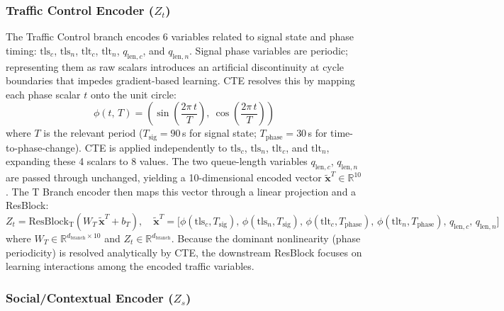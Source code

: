 \documentclass[journal]{IEEEtran}
\begin{document}
\subsubsection{Traffic Control Encoder ($Z_t$)}

The Traffic Control branch encodes 6 variables related to signal state and phase timing: $\text{tls}_c$, $\text{tls}_n$, $\text{tlt}_c$, $\text{tlt}_n$, $q_{\text{len},c}$, and $q_{\text{len},n}$.
Signal phase variables are periodic; representing them as raw scalars introduces an artificial discontinuity at cycle boundaries that impedes gradient-based learning.
CTE resolves this by mapping each phase scalar $t$ onto the unit circle:
\begin{equation}
\phi(t,\, T) = \left(\sin\!\left(\frac{2\pi\, t}{T}\right),\ \cos\!\left(\frac{2\pi\, t}{T}\right)\right)
\label{eq:cte}
\end{equation}
where $T$ is the relevant period ($T_\text{sig} = 90$\,s for signal state; $T_\text{phase} = 30$\,s for time-to-phase-change).
CTE is applied independently to $\text{tls}_c$, $\text{tls}_n$, $\text{tlt}_c$, and $\text{tlt}_n$, expanding these 4 scalars to 8 values.
The two queue-length variables $q_{\text{len},c}$, $q_{\text{len},n}$ are passed through unchanged, yielding a 10-dimensional encoded vector $\tilde{\mathbf{x}}^T \in \mathbb{R}^{10}$.
The T Branch encoder then maps this vector through a linear projection and a ResBlock:
\begin{equation}
Z_t = \text{ResBlock}_\text{T}\!\left(W_T\, \tilde{\mathbf{x}}^T + b_T\right), \quad
\tilde{\mathbf{x}}^T = \bigl[\phi(\text{tls}_c,T_\text{sig}),\, \phi(\text{tls}_n,T_\text{sig}),\, \phi(\text{tlt}_c,T_\text{phase}),\, \phi(\text{tlt}_n,T_\text{phase}),\, q_{\text{len},c},\, q_{\text{len},n}\bigr]
\label{eq:zt}
\end{equation}
where $W_T \in \mathbb{R}^{d_\text{branch} \times 10}$ and $Z_t \in \mathbb{R}^{d_\text{branch}}$.
Because the dominant nonlinearity (phase periodicity) is resolved analytically by CTE, the downstream ResBlock focuses on learning interactions among the encoded traffic variables.

\subsubsection{Social/Contextual Encoder ($Z_s$)}
\end{document}
